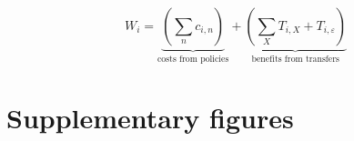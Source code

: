 \documentclass[12pt, a4paper]{article}
\begin{document}
\begin{refsection}
\begin{equation}
    W_{i} = \underbrace{(\sum_{n} c_{i,n})}_{\text{costs from policies}} + \underbrace{(\sum_{X} T_{i,X} + T_{i,\varepsilon})}_{\text{benefits from transfers}}
\end{equation}

\clearpage

\renewcommand\thefigure{\thesection.\arabic{figure}}
\renewcommand\thetable{\thesection.\arabic{table}}
\setcounter{figure}{0}
\setcounter{table}{0}

\section{Supplementary figures} \label{sec:figures}



\clearpage


\clearpage


\clearpage


\clearpage


\end{refsection}
\end{document}
